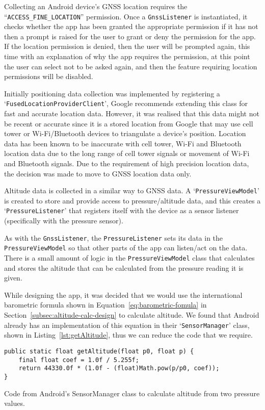 Collecting an Android device's GNSS location requires the ``\texttt{ACCESS\_FINE\_LOCATION}'' permission. Once a \texttt{GnssListener} is instantiated, it checks whether the app has been granted the appropriate permission if it has not then a prompt is raised for the user to grant or deny the permission for the app. If the location permission is denied, then the user will be prompted again, this time with an explanation of why the app requires the permission, at this point the user can select not to be asked again, and then the feature requiring location permissions will be disabled.

Initially positioning data collection was implemented by registering a `\texttt{FusedLocationProviderClient}', Google recommends extending this class for fast and accurate location data. However, it was realised that this data might not be recent or accurate since it is a stored location from Google that may use cell tower or Wi-Fi/Bluetooth devices to triangulate a device's position. Location data has been known to be inaccurate with cell tower, Wi-Fi and Bluetooth location data due to the long range of cell tower signals or movement of Wi-Fi and Bluetooth signals. Due to the requirement of high precision location data, the decision was made to move to GNSS location data only.

Altitude data is collected in a similar way to GNSS data. A `\texttt{PressureViewModel}' is created to store and provide access to pressure/altitude data, and this creates a `\texttt{PressureListener}' that registers itself with the device as a sensor listener (specifically with the pressure sensor).

As with the \texttt{GnssListener}, the \texttt{PressureListener} sets its data in the \texttt{PressureViewModel} so that other parts of the app can listen/act on the data. There is a small amount of logic in the \texttt{PressureViewModel} class that calculates and stores the altitude that can be calculated from the pressure reading it is given.

  While designing the app, it was decided that we would use the international barometric formula shown in Equation~\ref{eq:barometric-fomula} in Section~\ref{subsec:altitude-calc-design} to calculate altitude. We found that Android already has an implementation of this equation in their `\texttt{SensorManager}' class, shown in Listing~\vref{lst:getAltitude}, thus we can reduce the code that we require.

\begin{listing}
  \centering
  \begin{verbatim}
public static float getAltitude(float p0, float p) {
    final float coef = 1.0f / 5.255f;
    return 44330.0f * (1.0f - (float)Math.pow(p/p0, coef));
}
  \end{verbatim}
  \caption{Code from Android's SensorManager class to calculate altitude from two pressure values.~\cite{_android_????-1}}\label{lst:getAltitude}
\end{listing}

